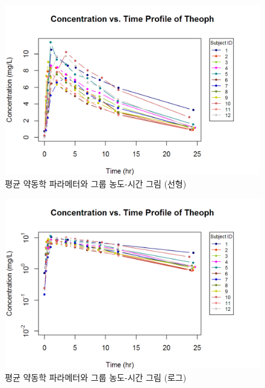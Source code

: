 \documentclass[12pt,]{krantz}
\theoremstyle{definition}
\theoremstyle{definition}
\theoremstyle{definition}
\theoremstyle{remark}
\begin{document}
\begin{figure}
\includegraphics[width=16.67in]{Output/PK_Profile_Linear_Scale_for_Theoph} \caption{평균 약동학 파라메터와 그룹 농도-시간 그림 (선형)}\label{fig:unnamed-chunk-19}
\end{figure}

\begin{figure}
\includegraphics[width=16.67in]{Output/PK_Profile_Log_10_Scale_for_Theoph} \caption{평균 약동학 파라메터와 그룹 농도-시간 그림 (로그)}\label{fig:unnamed-chunk-20}
\end{figure}
\end{document}
